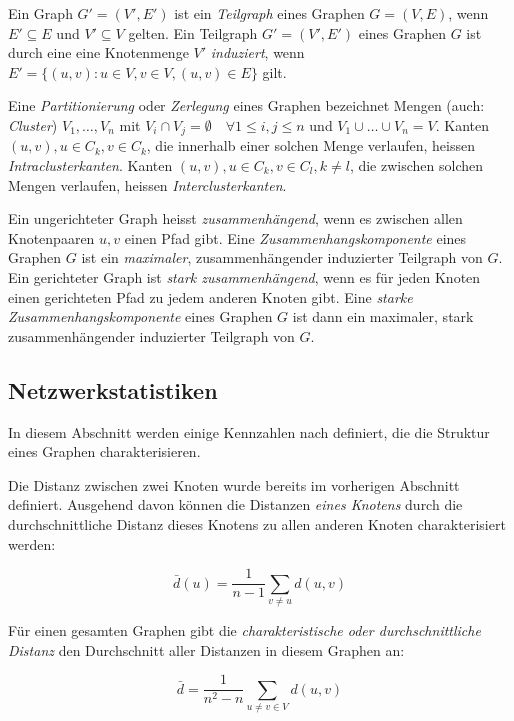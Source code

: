 Ein Graph $G' = (V', E')$ ist ein \emph{Teilgraph} eines Graphen $G =
(V, E)$, wenn $E' \subseteq E$ und $V' \subseteq V$ gelten. Ein
Teilgraph $G' = (V', E')$ eines Graphen $G$ ist durch eine eine
Knotenmenge $V'$ \emph{induziert}, wenn $E' = \{(u, v) : u \in V, v
\in V, (u, v) \in E\}$ gilt.

Eine \emph{Partitionierung} oder \emph{Zerlegung} eines Graphen
bezeichnet Mengen (auch: \emph{Cluster}) $V_1, \dots, V_n$ mit $V_i
\cap V_j = \emptyset \quad \forall 1 \le i, j \le n$ und $V_1 \cup
\dots \cup V_n = V$. Kanten $(u, v), u \in C_k, v \in C_k$, die
innerhalb einer solchen Menge verlaufen, heissen
\emph{Intraclusterkanten}. Kanten $(u, v), u \in C_k, v \in C_l, k \ne
l$, die zwischen solchen Mengen verlaufen, heissen
\emph{Interclusterkanten}.

Ein ungerichteter Graph heisst \emph{zusammenh\"angend}, wenn es
zwischen allen Knotenpaaren $u, v$ einen Pfad gibt. Eine
\emph{Zusammenhangskomponente} eines Graphen $G$ ist ein
\emph{maximaler}, zusammenh\"angender induzierter Teilgraph von
$G$. Ein gerichteter Graph ist \emph{stark zusammenh\"angend}, wenn es
f\"ur jeden Knoten einen gerichteten Pfad zu jedem anderen Knoten gibt. Eine
\emph{starke Zusammenhangskomponente} eines Graphen $G$ ist dann ein
maximaler, stark zusammenh\"angender induzierter Teilgraph von $G$.

\subsection{Netzwerkstatistiken}
\label{ch:Grundlagen:sec:Netzwerkanalyse:subsec:Statistiken}

In diesem Abschnitt werden einige Kennzahlen nach
\cite{Brinkmeier2004} definiert, die die Struktur eines Graphen
charakterisieren.

Die Distanz zwischen zwei Knoten wurde bereits im vorherigen Abschnitt
definiert. Ausgehend davon k\"onnen die Distanzen \emph{eines Knotens}
durch die durchschnittliche Distanz dieses Knotens zu allen anderen
Knoten charakterisiert werden:

\begin{equation}
  \label{eq:1}
  \bar{d}(u) = \frac{1}{n-1} \sum_{v \ne u} d(u, v)
\end{equation}

F\"ur einen gesamten Graphen gibt die \emph{charakteristische oder
  durchschnittliche Distanz} den Durchschnitt aller Distanzen in
diesem Graphen an:

\begin{equation}
  \label{eq:2}
  \bar{d} = \frac{1}{n^2 - n} \sum_{u \ne v \in V} d(u, v)
\end{equation}

